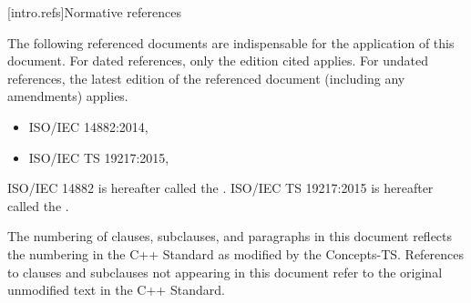 
[intro.refs]{Normative references}

\pnum
The following referenced documents are indispensable for the application of this
document. For dated references, only the edition cited applies. For undated
references, the latest edition of the referenced document (including any
amendments) applies.

\begin{itemize}
\item ISO/IEC 14882:2014, 
\item ISO/IEC TS 19217:2015, 
\end{itemize}

\pnum
ISO/IEC 14882 is hereafter called the . ISO/IEC TS 19217:2015 is hereafter called the .


\pnum
The numbering of clauses, subclauses, and paragraphs in this document reflects
the numbering in the C++ Standard as modified by the Concepts-TS.  References to clauses and subclauses not
appearing in this document refer to the original unmodified text
in the C++ Standard.
